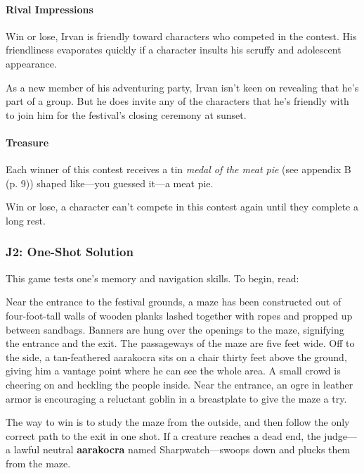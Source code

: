 \documentclass[a4paper, 11pt, bg=full, twocolumn, nooutline]{dndbook}
\begin{document}
\paragraph{Rival Impressions}

Win or lose, Irvan is friendly toward characters who competed in the contest. His friendliness evaporates quickly if a character insults his scruffy and adolescent appearance.

As a new member of his adventuring party, Irvan isn't keen on revealing that he's part of a group. But he does invite any of the characters that he's friendly with to join him for the festival's closing ceremony at sunset.

\paragraph{Treasure}

Each winner of this contest receives a tin \textit{medal of the meat pie} (see appendix B (p. 9)) shaped like---you guessed it---a meat pie.

Win or lose, a character can't compete in this contest again until they complete a long rest.


\subsubsection{J2: One-Shot Solution}

This game tests one's memory and navigation skills. To begin, read:

\begin{DndReadAloud}
Near the entrance to the festival grounds, a maze has been constructed out of four-foot-tall walls of wooden planks lashed together with ropes and propped up between sandbags. Banners are hung over the openings to the maze, signifying the entrance and the exit. The passageways of the maze are five feet wide. Off to the side, a tan-feathered aarakocra sits on a chair thirty feet above the ground, giving him a vantage point where he can see the whole area.
A small crowd is cheering on and heckling the people inside. Near the entrance, an ogre in leather armor is encouraging a reluctant goblin in a breastplate to give the maze a try.
\end{DndReadAloud}

The way to win is to study the maze from the outside, and then follow the only correct path to the exit in one shot. If a creature reaches a dead end, the judge---a lawful neutral \textbf{aarakocra} named Sharpwatch---swoops down and plucks them from the maze.
\end{document}
